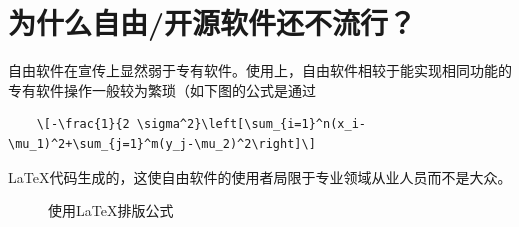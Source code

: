 \section{为什么自由/开源软件还不流行？}
自由软件在宣传上显然弱于专有软件。使用上，自由软件相较于能实现相同功能的专有软件操作一般较为繁琐（如下图的公式是通过
\begin{verbatim}
	\[-\frac{1}{2 \sigma^2}\left[\sum_{i=1}^n(x_i-\mu_1)^2+\sum_{j=1}^m(y_j-\mu_2)^2\right]\]
\end{verbatim}
\LaTeX 代码生成的，这使自由软件的使用者局限于专业领域从业人员而不是大众。
\begin{figure}[h]
\centering
{}
\caption{使用\LaTeX 排版公式}
\end{figure}